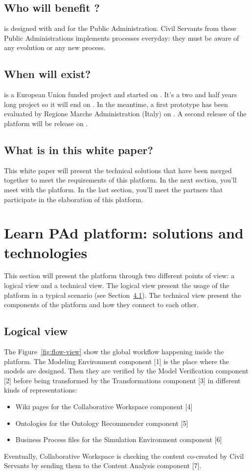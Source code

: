 \documentclass{learnpad}
\begin{document}
\section{Who will benefit \learnpad?}
\learnpad is designed with and for the Public Administration.  Civil Servants
from these Public Administrations implements processes everyday: they must be
aware of any evolution or any new process.

\section{When will \learnpad exist?}
\learnpad is a European Union funded project and started on
\origdate{}.  It's a two and half years long project so it
will end on .  In the meantime, a first prototype has been
evaluated by Regione Marche Administration (Italy) on .  A
second release of the platform will be release on .

\section{What is in this white paper?}
This white paper will present the technical solutions that have been merged
together to meet the requirements of this \learnpad platform.  In the next
section, you'll meet with the \learnpad platform.  In the last section, you'll
meet the partners that participate in the elaboration of this \learnpad
platform.

\chapter{Learn PAd platform: solutions and technologies}
\label{ch:platform}
This section will present the \learnpad platform through two different points of
view: a logical view and a technical view.  The logical view present the usage
of the platform in a typical scenario (see Section~\ref{sec:flow-view}).  The
technical view present the components of the  platform and how they connect to
each other.

\section{Logical view}
\label{sec:flow-view}
The Figure~\ref{fig:flow-view} show the global workflow happening inside the
\learnpad platform.  The Modeling Environment component [1] is the place where
the models are designed.  Then they are verified by the Model Verification
component [2] before being transformed by the Transformations component [3] in
different kinds of representations:
\begin{itemize}
	\item Wiki pages for the Collaborative Workspace component [4]
	\item Ontologies for the Ontology Recommender component [5]
	\item Business Process files for the Simulation Environment
		component [6]
\end{itemize}
Eventually, Collaborative Workspace is checking the content co-created by Civil
Servants by sending them to the Content Analysis component [7].
\end{document}
